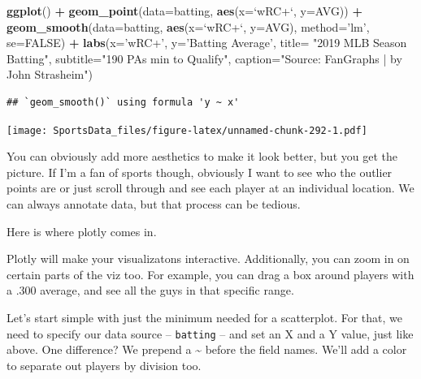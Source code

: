 \documentclass[
]{book}
\newenvironment{Shaded}{\begin{snugshade}}{\end{snugshade}}
\newcommand{\DataTypeTok}[1]{\textcolor[rgb]{0.13,0.29,0.53}{#1}}
\newcommand{\KeywordTok}[1]{\textcolor[rgb]{0.13,0.29,0.53}{\textbf{#1}}}
\newcommand{\NormalTok}[1]{#1}
\newcommand{\OperatorTok}[1]{\textcolor[rgb]{0.81,0.36,0.00}{\textbf{#1}}}
\newcommand{\OtherTok}[1]{\textcolor[rgb]{0.56,0.35,0.01}{#1}}
\newcommand{\StringTok}[1]{\textcolor[rgb]{0.31,0.60,0.02}{#1}}
\begin{document}
\begin{Shaded}
\begin{Highlighting}[]
\KeywordTok{ggplot}\NormalTok{() }\OperatorTok{+}
\StringTok{  }\KeywordTok{geom_point}\NormalTok{(}\DataTypeTok{data=}\NormalTok{batting, }\KeywordTok{aes}\NormalTok{(}\DataTypeTok{x=}\StringTok{`}\DataTypeTok{wRC+}\StringTok{`}\NormalTok{, }\DataTypeTok{y=}\NormalTok{AVG)) }\OperatorTok{+}
\StringTok{  }\KeywordTok{geom_smooth}\NormalTok{(}\DataTypeTok{data=}\NormalTok{batting, }\KeywordTok{aes}\NormalTok{(}\DataTypeTok{x=}\StringTok{`}\DataTypeTok{wRC+}\StringTok{`}\NormalTok{, }\DataTypeTok{y=}\NormalTok{AVG), }\DataTypeTok{method=}\StringTok{'lm'}\NormalTok{, }\DataTypeTok{se=}\OtherTok{FALSE}\NormalTok{) }\OperatorTok{+}
\StringTok{  }\KeywordTok{labs}\NormalTok{(}\DataTypeTok{x=}\StringTok{'wRC+'}\NormalTok{, }\DataTypeTok{y=}\StringTok{'Batting Average'}\NormalTok{, }\DataTypeTok{title=} \StringTok{"2019 MLB Season Batting"}\NormalTok{, }\DataTypeTok{subtitle=}\StringTok{"190 PAs min to Qualify"}\NormalTok{, }\DataTypeTok{caption=}\StringTok{"Source:  FanGraphs | by John Strasheim"}\NormalTok{)}
\end{Highlighting}
\end{Shaded}

\begin{verbatim}
## `geom_smooth()` using formula 'y ~ x'
\end{verbatim}

\texttt{[image: SportsData\_files/figure-latex/unnamed-chunk-292-1.pdf]}

You can obviously add more aesthetics to make it look better, but you get the picture. If I'm a fan of sports though, obviously I want to see who the outlier points are or just scroll through and see each player at an individual location. We can always annotate data, but that process can be tedious.

Here is where plotly comes in.

Plotly will make your visualizatons interactive. Additionally, you can zoom in on certain parts of the viz too. For example, you can drag a box around players with a .300 average, and see all the guys in that specific range.

Let's start simple with just the minimum needed for a scatterplot. For that, we need to specify our data source -- \texttt{batting} -- and set an X and a Y value, just like above. One difference? We prepend a \textasciitilde{} before the field names. We'll add a color to separate out players by division too.
\end{document}
